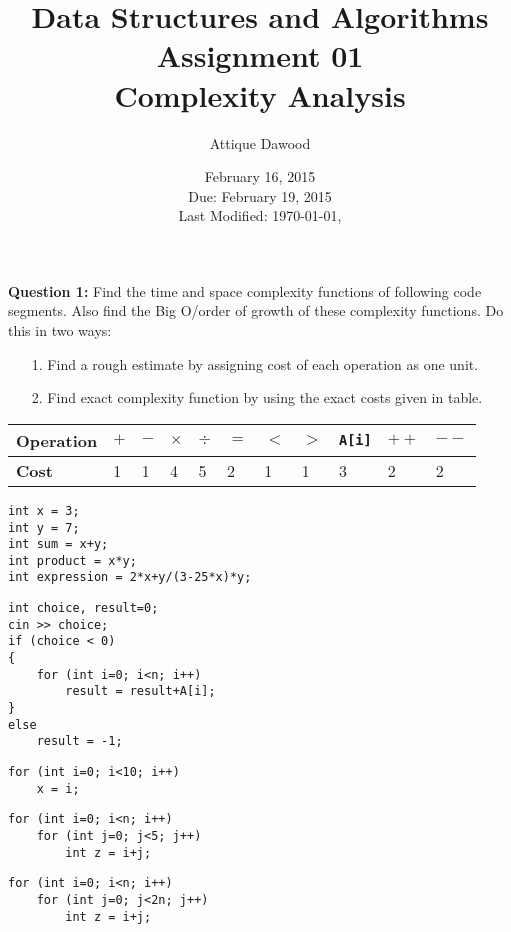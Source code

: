 \documentclass[12pt,a4paper]{article}
\title{Data Structures and Algorithms\\Assignment 01\\Complexity Analysis}
\author{Attique Dawood}
\date{February 16, 2015\\Due: February 19, 2015\\[0.2cm] Last Modified: \today, \currenttime}
\begin{document}
\maketitle
\noindent\textbf{Question 1:} Find the time and space complexity functions of following code segments. Also find the Big O/order of growth of these complexity functions. Do this in two ways:
\begin{itemize}
\item[1.] Find a rough estimate by assigning cost of each operation as one unit.
\item[2.] Find exact complexity function by using the exact costs given in table.
\end{itemize}
\begin{table}[H]
\begin{center}
	{\footnotesize \begin{tabular}{|C{1.8cm}|C{0.75cm}|C{0.75cm}|C{0.75cm}|C{0.75cm}|C{0.75cm}|C{0.75cm}|C{0.75cm}|C{0.75cm}|C{0.75cm}|C{0.75cm}|}
	\hline
		\rule{0pt}{2.5ex}\textbf{Operation}& $+$ & $-$ & $\times$ & $\div$ & $=$ & $<$ & $>$ & \verb|A[i]| & $++$ & $--$ \\
		\hline
		\rule{0pt}{2.5ex}\textbf{Cost}& 1 & 1 & 4 & 5 & 2 & 1 & 1 & 3 & 2 & 2 \\
	\hline
	\end{tabular}}
\end{center}
\end{table}
\begin{lstlisting}
int x = 3;
int y = 7;
int sum = x+y;
int product = x*y;
int expression = 2*x+y/(3-25*x)*y;
\end{lstlisting}
\begin{lstlisting}
int choice, result=0;
cin >> choice;
if (choice < 0)
{
    for (int i=0; i<n; i++)
        result = result+A[i];
}
else
    result = -1;
\end{lstlisting}
\begin{lstlisting}
for (int i=0; i<10; i++)
    x = i;
\end{lstlisting}
\begin{lstlisting}
for (int i=0; i<n; i++)
    for (int j=0; j<5; j++)
        int z = i+j;
\end{lstlisting}
\begin{lstlisting}
for (int i=0; i<n; i++)
    for (int j=0; j<2n; j++)
        int z = i+j;
\end{lstlisting}
\end{document}

